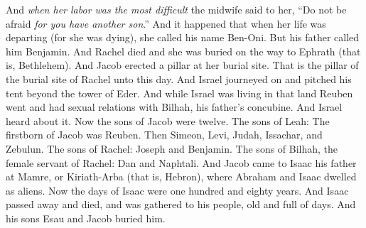 \begin{biblechapter}
\verse And \textit{when her labor was the most difficult} the midwife said to her, “Do not be afraid \textit{for you have another son}.”
\verse And it happened that when her life was departing (for she was dying), she called his name Ben-Oni. But his father called him Benjamin.
\verse And Rachel died and she was buried on the way to Ephrath (that is, Bethlehem).
\verse And Jacob erected a pillar at her burial site. That is the pillar of the burial site of Rachel unto this day.
\verse And Israel journeyed on and pitched his tent beyond the tower of Eder.
\verse And while Israel was living in that land Reuben went and had sexual relations with Bilhah, his father’s concubine. And Israel heard about it.
 Now the sons of Jacob were twelve.
\verse The sons of Leah: The firstborn of Jacob was Reuben. Then Simeon, Levi, Judah, Issachar, and Zebulun.
\verse The sons of Rachel: Joseph and Benjamin.
\verse The sons of Bilhah, the female servant of Rachel: Dan and Naphtali.
 And Jacob came to Isaac his father at Mamre, or Kiriath-Arba (that is, Hebron), where Abraham and Isaac dwelled as aliens.
\verse Now the days of Isaac were one hundred and eighty years.
\verse And Isaac passed away and died, and was gathered to his people, old and full of days. And his sons Esau and Jacob buried him.
\end{biblechapter}

